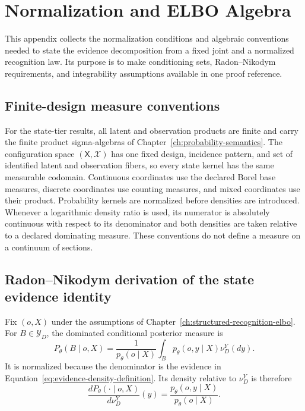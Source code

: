 \chapter{Normalization and ELBO Algebra}

This appendix collects the normalization conditions and algebraic conventions needed to state the evidence decomposition from a fixed joint and a normalized recognition law. Its purpose is to make conditioning sets, Radon--Nikodym requirements, and integrability assumptions available in one proof reference.

\section{Finite-design measure conventions}

For the state-tier results, all latent and observation products are finite and carry the finite product sigma-algebras of Chapter~\ref{ch:probability-semantics}. The configuration space \((\mathsf X,\mathscr X)\) has one fixed design, incidence pattern, and set of identified latent and observation fibers, so every state kernel has the same measurable codomain. Continuous coordinates use the declared Borel base measures, discrete coordinates use counting measures, and mixed coordinates use their product. Probability kernels are normalized before densities are introduced. Whenever a logarithmic density ratio is used, its numerator is absolutely continuous with respect to its denominator and both densities are taken relative to a declared dominating measure. These conventions do not define a measure on a continuum of sections.

\section{Radon--Nikodym derivation of the state evidence identity}
\label{sec:state-elbo-radon-nikodym}

Fix \((o,X)\) under the assumptions of Chapter~\ref{ch:structured-recognition-elbo}. For \(B\in\mathscr Y_D\), the dominated conditional posterior measure is
\begin{equation}
P_\theta(B\mid o,X)
=\frac{1}{p_\theta(o\mid X)}
\int_B p_\theta(o,y\mid X)\nu_D^Y(dy).
\label{eq:appendix-posterior-measure}
\end{equation}
It is normalized because the denominator is the evidence in Equation~\eqref{eq:evidence-density-definition}. Its density relative to \(\nu_D^Y\) is therefore
\begin{equation}
\frac{dP_\theta(\mathord\cdot\mid o,X)}{d\nu_D^Y}(y)
=\frac{p_\theta(o,y\mid X)}{p_\theta(o\mid X)}.
\label{eq:appendix-posterior-density}
\end{equation}

